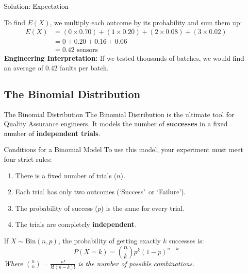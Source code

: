 \begin{frame}{Solution: Expectation}
    \begin{solution}
        To find $E(X)$, we multiply each outcome by its probability and sum them up:
        \begin{align*}
            E(X) &= (0 \times 0.70) + (1 \times 0.20) + (2 \times 0.08) + (3 \times 0.02) \\
                 &= 0 + 0.20 + 0.16 + 0.06 \\
                 &= \mathbf{0.42} \text{ sensors}
        \end{align*}
        \textbf{Engineering Interpretation:} If we tested thousands of batches, we would find an average of 0.42 faults per batch.
    \end{solution}
\end{frame}

\subsection{The Binomial Distribution}

\begin{frame}[allowframebreaks]{The Binomial Distribution}
    The Binomial Distribution is the ultimate tool for Quality Assurance engineers. It models the number of \textbf{successes} in a fixed number of \textbf{independent trials}.

    \vspace{0.2cm}
    \begin{block}{Conditions for a Binomial Model}
        To use this model, your experiment must meet four strict rules:
        \begin{enumerate}
            \item There is a fixed number of trials ($n$).
            \item Each trial has only two outcomes (\lq Success\rq\ or \lq Failure\rq).
            \item The probability of success ($p$) is the same for every trial.
            \item The trials are completely \textbf{independent}.
        \end{enumerate}
    \end{block}


    \begin{definition}
        If $X \sim \text{Bin}(n, p)$, the probability of getting exactly $k$ successes is:
        \[ P(X=k) = \binom{n}{k} p^k (1-p)^{n-k} \]
        \textit{Where $\binom{n}{k} = \frac{n!}{k!(n-k)!}$ is the number of possible combinations.}
    \end{definition}
\end{frame}

